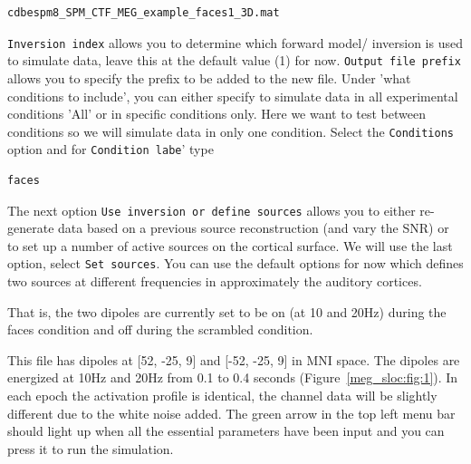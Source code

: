 \begin{verbatim}
cdbespm8_SPM_CTF_MEG_example_faces1_3D.mat
\end{verbatim}

\texttt{Inversion index} allows you to determine which forward model/ inversion is used to simulate data, leave this at the default value (1) for now.
\texttt{Output file prefix} allows you to specify the prefix to be added to the new file.
Under 'what conditions to include',  you can either specify to simulate data in all experimental conditions 'All' or in specific conditions only. Here we want to test between conditions so we will simulate data  in only one condition. Select the \texttt{Conditions} option and for \texttt{Condition labe}'  type 
\begin{verbatim}
faces
\end{verbatim}

The next option \texttt{Use inversion or define sources} allows you to either re-generate data based on a previous source reconstruction (and vary the SNR) or to set up a number of active sources on the cortical surface. We will use the last option, select \texttt{Set sources}. You can use the default options for now which defines two sources at different frequencies in approximately the auditory cortices.

That is, the two dipoles are currently set to be on (at 10 and 20Hz) during the faces condition and off during the scrambled condition.

This file has dipoles at [52, -25, 9] and  [-52, -25, 9] in MNI space. The dipoles are energized at 10Hz and 20Hz from 0.1 to 0.4 seconds (Figure~\ref{meg_sloc:fig:1}). In each epoch the activation profile is identical, the channel data will be slightly different due to the white noise added. The green arrow in the top left menu bar should light up when all the essential parameters have been input and you can press it to run the simulation.

